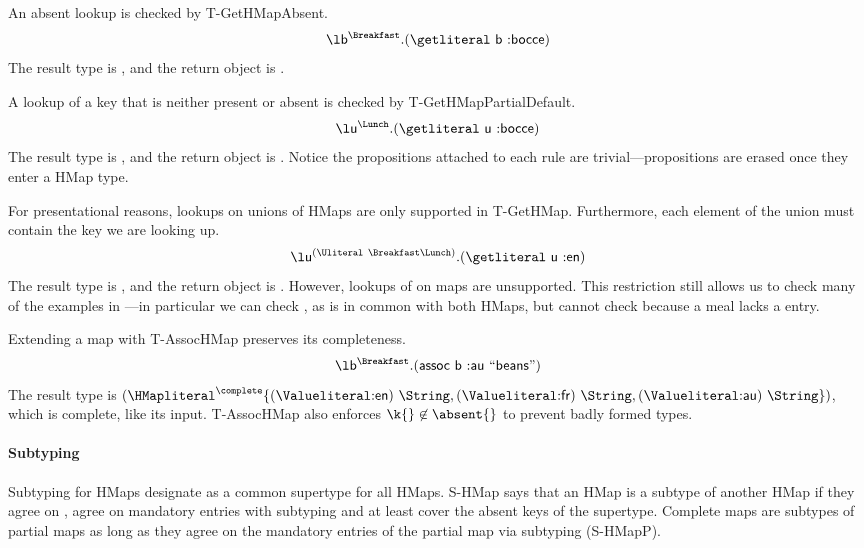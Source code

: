 An absent lookup is checked by T-GetHMapAbsent.
$$
\abs{\makelocal{b}}{\Breakfast}{\getexp{\makelocal{b}}{\makekw{bocce}}}
$$
The result type is \Nil, and the return object is .

A lookup of a key that is neither present or absent is checked by
T-GetHMapPartialDefault.
$$
\abs{\makelocal{u}}{\Lunch}{\getexp{\makelocal{u}}{\makekw{bocce}}}
$$
The result type is \Top, and the return object is .
Notice the propositions attached to each \getliteral{} rule are trivial---propositions
are erased once they enter a HMap type.

For presentational reasons, lookups on unions of HMaps are only supported in T-GetHMap. 
Furthermore, each element of the union must contain the key we are looking up.
$$
\abs{\makelocal{u}}{\Unionsplice{\Breakfast \Lunch}}{\getexp{\makelocal{u}}{\makekw{en}}}
$$
The result type is \String, and the return object is .
However, lookups of  on {\Unionsplice{\Breakfast \Lunch}} maps are unsupported.
This restriction still allows us to check many of the examples in ---in
particular we can check 
, as  is in common with both HMaps,
but cannot check 
because a  meal lacks a  entry.

Extending a map with T-AssocHMap preserves its completeness.
$$
\abs{\makelocal{b}}{\Breakfast}{\assocexp{\makelocal{b}}{\makekw{au}}{\makestr{beans}}}
$$
The result type is
$
\HMapc{\mandatoryset{\mandatoryentrynoarrow{\Valkw{en}}{\String}, {\mandatoryentrynoarrow{\Valkw{fr}}{\String}}
        ,{\mandatoryentrynoarrow{\Valkw{au}}{\String}}}}
$,
which is complete, like its input.
T-AssocHMap also enforces ${\k{}} \not\in {\absent{}}$ to prevent badly formed types.


\paragraph{Subtyping}
Subtyping for HMaps
designate \MapLiteral{} as a common supertype for all HMaps.
S-HMap says that an HMap is a subtype of another HMap if they agree
on \completenessmeta{}, agree on mandatory entries with subtyping
and at least cover the absent keys of the supertype.
Complete maps are subtypes of partial maps
as long as they agree on the mandatory entries of the partial map via subtyping (S-HMapP).

